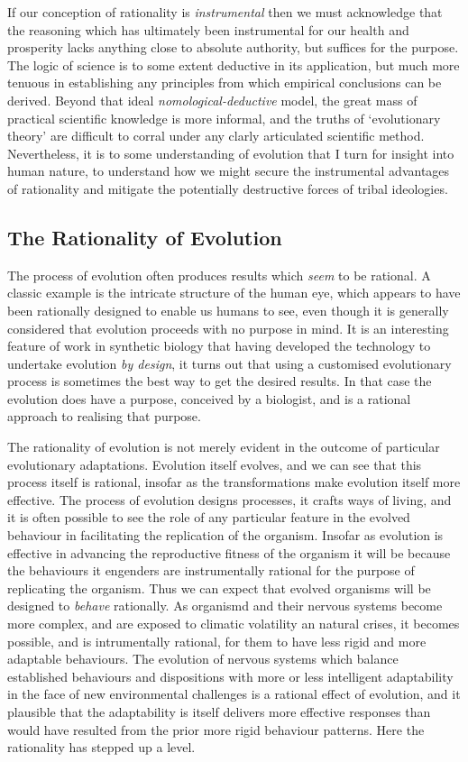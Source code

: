 \documentclass[10pt,titlepage]{book}
\begin{document}
If our conception of rationality is \emph{instrumental} then we must acknowledge that the reasoning which has ultimately been instrumental for our health and prosperity lacks anything close to absolute authority, but suffices for the purpose.
The logic of science is to some extent deductive in its application, but much more tenuous in establishing any principles from which empirical conclusions can be derived.
Beyond that ideal \emph{nomological-deductive} model, the great mass of practical scientific knowledge is more informal, and the truths of `evolutionary theory' are difficult to corral under any clarly articulated scientific method.
Nevertheless, it is to some understanding of evolution that I turn for insight into human nature, to understand how we might secure the instrumental advantages of rationality and mitigate the potentially destructive forces of tribal ideologies.

\subsection{The Rationality of Evolution}

The process of evolution often produces results which \emph{seem} to be rational.
A classic example is the intricate structure of the human eye, which appears to have been rationally designed to enable us humans to see, even though it is generally considered that evolution proceeds with no purpose in mind.
It is an interesting feature of work in synthetic biology that having developed the technology to undertake evolution \emph{by design}, it turns out that using a customised evolutionary process is sometimes the best way to get the desired results.
In that case the evolution does have a purpose, conceived by a biologist, and is a rational approach to realising that purpose.

The rationality of evolution is not merely evident in the outcome of particular evolutionary adaptations.
Evolution itself evolves, and we can see that this process itself is rational, insofar as the transformations make evolution itself more effective.
The process of evolution designs processes, it crafts ways of living, and it is often possible to see the role of any particular feature in the evolved behaviour in facilitating the replication of the organism.
Insofar as evolution is effective in advancing the reproductive fitness of the organism it will be because the behaviours it engenders are instrumentally rational for the purpose of replicating the organism.
Thus we can expect that evolved organisms will be designed to \emph{behave} rationally.
As organismd and their nervous systems become more complex, and are exposed to climatic volatility an natural crises, it becomes possible, and is intrumentally rational, for them to have less rigid and more adaptable behaviours.
The evolution of nervous systems which balance established behaviours and dispositions with more or less intelligent adaptability in the face of new environmental challenges is a rational effect of evolution, and it plausible that the adaptability is itself delivers more effective responses than would have resulted from the prior more rigid behaviour patterns.
Here the rationality has stepped up a level.
\end{document}

